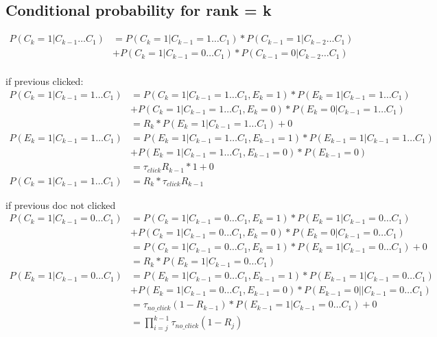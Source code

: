 \subsection {Conditional probability for rank = k}
\begin{align*}
P(C_k = 1 |C_{k-1} \dots C_1)
&= P(C_k = 1 | C_{k-1}=1 \dots C_1) * P(C_{k-1} = 1| C_{k-2} \dots C_1) \\
&+ P(C_k = 1 | C_{k-1}=0 \dots C_1) * P(C_{k-1} = 0| C_{k-2} \dots C_1) \\
\end{align*}

if previous clicked:
\begin{align*}
P(C_k = 1 | C_{k-1}=1 \dots C_1)
&= P(C_k = 1 | C_{k-1}=1 \dots C_1, E_k = 1) * P(E_k = 1 | C_{k-1}=1 \dots C_1) \\
&+ P(C_k = 1 | C_{k-1}=1 \dots C_1, E_k = 0) * P(E_k = 0 | C_{k-1}=1 \dots C_1) \\
&= R_k * P(E_k = 1 | C_{k-1}=1 \dots C_1) + 0 \\
P(E_k = 1 | C_{k-1}=1 \dots C_1) 
&= P(E_k = 1 | C_{k-1}=1 \dots C_1, E_{k-1} = 1) * P(E_{k-1}=1 | C_{k-1}=1 \dots C_1) \\
&+ P(E_k = 1 | C_{k-1}=1 \dots C_1, E_{k-1} = 0) * P(E_{k-1}=0) \\
&= \tau_{click}R_{k-1} * 1 + 0 \\
P(C_k = 1 | C_{k-1}=1 \dots C_1) 
&= R_k * \tau_{click}R_{k-1}
\end{align*}


if previous doc not clicked
\begin{align*}
P(C_k = 1 | C_{k-1}=0 \dots C_1)
&= P(C_k = 1 | C_{k-1}=0 \dots C_1, E_k = 1) * P(E_k = 1 | C_{k-1}=0 \dots C_1) \\
&+ P(C_k = 1 | C_{k-1}=0 \dots C_1, E_k = 0) * P(E_k = 0 | C_{k-1}=0 \dots C_1) \\
&= P(C_k = 1 | C_{k-1}=0 \dots C_1, E_k = 1) * P(E_k = 1 | C_{k-1}=0 \dots C_1) + 0 \\
&= R_k * P(E_k = 1 | C_{k-1}=0 \dots C_1) \\
P(E_k = 1 | C_{k-1}=0 \dots C_1) 
&= P(E_k = 1 | C_{k-1}=0 \dots C_1, E_{k-1} = 1) * P(E_{k-1}=1 | C_{k-1}=0 \dots C_1) \\
&+ P(E_k = 1 | C_{k-1}=0 \dots C_1, E_{k-1} = 0) * P(E_{k-1}=0 | | C_{k-1}=0 \dots C_1) \\
&= \tau_{no\_click}(1-R_{k-1}) * P(E_{k-1}=1 | C_{k-1}=0 \dots C_1) + 0 \\
&= \prod^{k-1}_{i = j}\tau_{no\_click} (1-R_j)
\end{align*}

